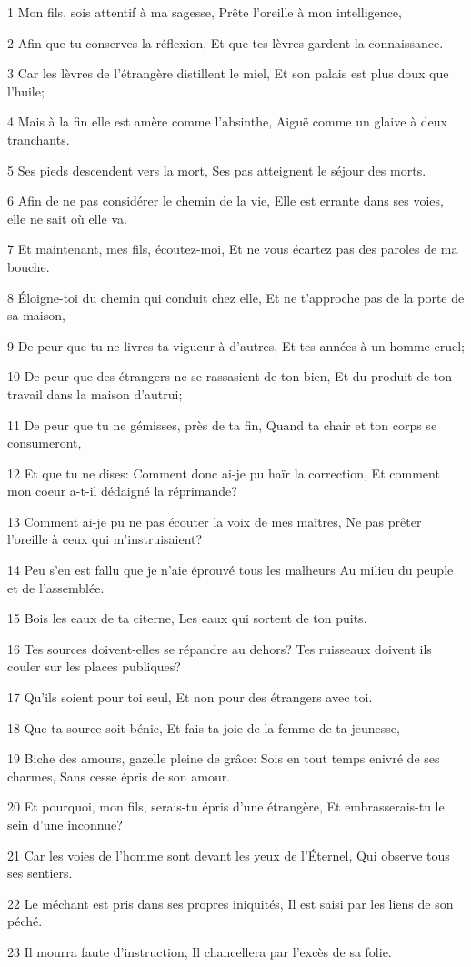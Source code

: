\par 1 Mon fils, sois attentif à ma sagesse, Prête l'oreille à mon intelligence,
\par 2 Afin que tu conserves la réflexion, Et que tes lèvres gardent la connaissance.
\par 3 Car les lèvres de l'étrangère distillent le miel, Et son palais est plus doux que l'huile;
\par 4 Mais à la fin elle est amère comme l'absinthe, Aiguë comme un glaive à deux tranchants.
\par 5 Ses pieds descendent vers la mort, Ses pas atteignent le séjour des morts.
\par 6 Afin de ne pas considérer le chemin de la vie, Elle est errante dans ses voies, elle ne sait où elle va.
\par 7 Et maintenant, mes fils, écoutez-moi, Et ne vous écartez pas des paroles de ma bouche.
\par 8 Éloigne-toi du chemin qui conduit chez elle, Et ne t'approche pas de la porte de sa maison,
\par 9 De peur que tu ne livres ta vigueur à d'autres, Et tes années à un homme cruel;
\par 10 De peur que des étrangers ne se rassasient de ton bien, Et du produit de ton travail dans la maison d'autrui;
\par 11 De peur que tu ne gémisses, près de ta fin, Quand ta chair et ton corps se consumeront,
\par 12 Et que tu ne dises: Comment donc ai-je pu haïr la correction, Et comment mon coeur a-t-il dédaigné la réprimande?
\par 13 Comment ai-je pu ne pas écouter la voix de mes maîtres, Ne pas prêter l'oreille à ceux qui m'instruisaient?
\par 14 Peu s'en est fallu que je n'aie éprouvé tous les malheurs Au milieu du peuple et de l'assemblée.
\par 15 Bois les eaux de ta citerne, Les eaux qui sortent de ton puits.
\par 16 Tes sources doivent-elles se répandre au dehors? Tes ruisseaux doivent ils couler sur les places publiques?
\par 17 Qu'ils soient pour toi seul, Et non pour des étrangers avec toi.
\par 18 Que ta source soit bénie, Et fais ta joie de la femme de ta jeunesse,
\par 19 Biche des amours, gazelle pleine de grâce: Sois en tout temps enivré de ses charmes, Sans cesse épris de son amour.
\par 20 Et pourquoi, mon fils, serais-tu épris d'une étrangère, Et embrasserais-tu le sein d'une inconnue?
\par 21 Car les voies de l'homme sont devant les yeux de l'Éternel, Qui observe tous ses sentiers.
\par 22 Le méchant est pris dans ses propres iniquités, Il est saisi par les liens de son péché.
\par 23 Il mourra faute d'instruction, Il chancellera par l'excès de sa folie.

